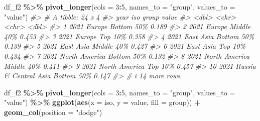 \documentclass[
  xelatex, ja=standard]{bxjsbook}
\newenvironment{Shaded}{\begin{snugshade}}{\end{snugshade}}
\newcommand{\AttributeTok}[1]{\textcolor[rgb]{0.13,0.29,0.53}{#1}}
\newcommand{\CommentTok}[1]{\textcolor[rgb]{0.56,0.35,0.01}{\textit{#1}}}
\newcommand{\DecValTok}[1]{\textcolor[rgb]{0.00,0.00,0.81}{#1}}
\newcommand{\FunctionTok}[1]{\textcolor[rgb]{0.13,0.29,0.53}{\textbf{#1}}}
\newcommand{\NormalTok}[1]{#1}
\newcommand{\SpecialCharTok}[1]{\textcolor[rgb]{0.81,0.36,0.00}{\textbf{#1}}}
\newcommand{\StringTok}[1]{\textcolor[rgb]{0.31,0.60,0.02}{#1}}
\theoremstyle{definition}
\theoremstyle{definition}
\theoremstyle{definition}
\theoremstyle{definition}
\theoremstyle{remark}
\begin{document}
\begin{Shaded}
\begin{Highlighting}[]
\NormalTok{df\_f2 }\SpecialCharTok{\%\textgreater{}\%} \FunctionTok{pivot\_longer}\NormalTok{(}\AttributeTok{cols =} \DecValTok{3}\SpecialCharTok{:}\DecValTok{5}\NormalTok{, }\AttributeTok{names\_to =} \StringTok{"group"}\NormalTok{, }\AttributeTok{values\_to =} \StringTok{"value"}\NormalTok{)}
\CommentTok{\#\textgreater{} \# A tibble: 24 x 4}
\CommentTok{\#\textgreater{}     year iso                   group      value}
\CommentTok{\#\textgreater{}    \textless{}dbl\textgreater{} \textless{}chr\textgreater{}                 \textless{}chr\textgreater{}      \textless{}dbl\textgreater{}}
\CommentTok{\#\textgreater{}  1  2021 Europe                Bottom 50\% 0.189}
\CommentTok{\#\textgreater{}  2  2021 Europe                Middle 40\% 0.453}
\CommentTok{\#\textgreater{}  3  2021 Europe                Top 10\%    0.358}
\CommentTok{\#\textgreater{}  4  2021 East Asia             Bottom 50\% 0.139}
\CommentTok{\#\textgreater{}  5  2021 East Asia             Middle 40\% 0.427}
\CommentTok{\#\textgreater{}  6  2021 East Asia             Top 10\%    0.434}
\CommentTok{\#\textgreater{}  7  2021 North America         Bottom 50\% 0.132}
\CommentTok{\#\textgreater{}  8  2021 North America         Middle 40\% 0.411}
\CommentTok{\#\textgreater{}  9  2021 North America         Top 10\%    0.457}
\CommentTok{\#\textgreater{} 10  2021 Russia \& Central Asia Bottom 50\% 0.147}
\CommentTok{\#\textgreater{} \# i 14 more rows}
\end{Highlighting}
\end{Shaded}

\begin{Shaded}
\begin{Highlighting}[]
\NormalTok{df\_f2 }\SpecialCharTok{\%\textgreater{}\%} \FunctionTok{pivot\_longer}\NormalTok{(}\AttributeTok{cols =} \DecValTok{3}\SpecialCharTok{:}\DecValTok{5}\NormalTok{, }\AttributeTok{names\_to =} \StringTok{"group"}\NormalTok{, }\AttributeTok{values\_to =} \StringTok{"value"}\NormalTok{) }\SpecialCharTok{\%\textgreater{}\%}
  \FunctionTok{ggplot}\NormalTok{(}\FunctionTok{aes}\NormalTok{(}\AttributeTok{x =}\NormalTok{ iso, }\AttributeTok{y =}\NormalTok{ value, }\AttributeTok{fill =}\NormalTok{ group)) }\SpecialCharTok{+}
  \FunctionTok{geom\_col}\NormalTok{(}\AttributeTok{position =} \StringTok{"dodge"}\NormalTok{)}
\end{Highlighting}
\end{Shaded}
\end{document}
